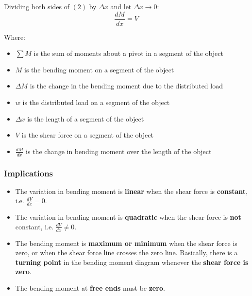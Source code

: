 \documentclass[11pt]{article}
\begin{document}
Dividing both sides of \((2)\) by \(\Delta x\) and let \(\Delta x \rightarrow 0\):
\[\frac{dM}{dx} = V\]

Where:
\begin{itemize}
\item \(\sum M\) is the sum of moments about a pivot in a segment of the object
\item \(M\) is the bending moment on a segment of the object
\item \(\Delta M\) is the change in the bending moment due to the distributed load
\item \(w\) is the distributed load on a segment of the object
\item \(\Delta x\) is the length of a segment of the object
\item \(V\) is the shear force on a segment of the object
\item \(\frac{dM}{dx}\) is the change in bending moment over the length of the object
\end{itemize}
\subsubsection{Implications}
\label{sec:org53f36b4}
\begin{itemize}
\item The variation in bending moment is \textbf{linear} when the shear force is \textbf{constant}, i.e. \(\frac{dV}{dx} = 0\).
\item The variation in bending moment is \textbf{quadratic} when the shear force is \textbf{not} constant, i.e. \(\frac{dV}{dx} \ne 0\).
\item The bending moment is \textbf{maximum or minimum} when the shear force is zero, or when the shear force line crosses the zero line. Basically, there is a \textbf{turning point} in the bending moment diagram whenever the \textbf{shear force is zero}.
\item The bending moment at \textbf{free ends} must be \textbf{zero}.
\end{itemize}

\newpage
\end{document}
